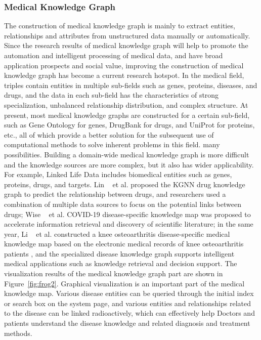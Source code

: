 \subsubsection{ Medical Knowledge Graph}

The construction of medical knowledge graph is mainly to extract entities, relationships and attributes from unstructured data manually or automatically. Since the research results of medical knowledge graph will help to promote the automation and intelligent processing of medical data, and have broad application prospects and social value, improving the construction of medical knowledge graph has become a current research hotspot. In the medical field, triples contain entities in multiple sub-fields such as genes, proteins, diseases, and drugs, and the data in each sub-field has the characteristics of strong specialization, unbalanced relationship distribution, and complex structure. At present, most medical knowledge graphs are constructed for a certain sub-field, such as Gene Ontology for genes, DrugBank for drugs, and UniProt for proteins, etc., all of which provide a better solution for the subsequent use of computational methods to solve inherent problems in this field. many possibilities. Building a domain-wide medical knowledge graph is more difficult and the knowledge sources are more complex, but it also has wider applicability. For example, Linked Life Data includes biomedical entities such as genes, proteins, drugs, and targets. Lin ~\cite{2020KGNN} et al. proposed the KGNN drug knowledge graph to predict the relationship between drugs, and researchers used a combination of multiple data sources to focus on the potential links between drugs; Wise ~\cite{2020COVID} et al. COVID-19 disease-specific knowledge map was proposed to accelerate information retrieval and discovery of scientific literature; in the same year, Li ~\cite{2020Automatic} et al. constructed a knee osteoarthritis disease-specific medical knowledge map based on the electronic medical records of knee osteoarthritis patients , and the specialized disease knowledge graph supports intelligent medical applications such as knowledge retrieval and decision support. The visualization results of the medical knowledge graph part are shown in Figure~\ref{fig:frog2}. Graphical visualization is an important part of the medical knowledge map. Various disease entities can be queried through the initial index or search box on the system page, and various entities and relationships related to the disease can be linked radioactively, which can effectively help Doctors and patients understand the disease knowledge and related diagnosis and treatment methods.

